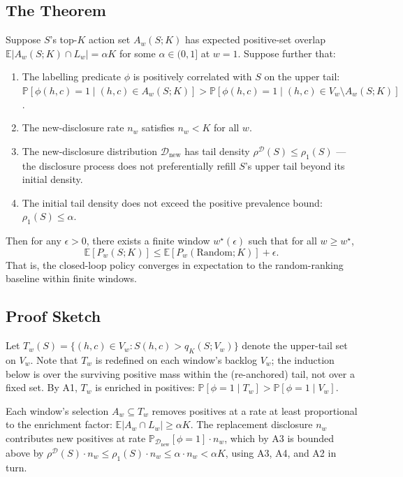 \subsection{The Theorem}

\begin{theorem}
\label{thm:exhaustion}
Suppose $S$'s top-$K$ action set $A_w(S; K)$ has expected positive-set
overlap $\mathbb{E}|A_w(S; K) \cap L_w| = \alpha K$ for some
$\alpha \in (0, 1]$ at $w = 1$. Suppose further that:
\begin{enumerate}
\item[(A1)] The labelling predicate $\phi$ is positively correlated
with $S$ on the upper tail: $\mathbb{P}[\phi(h, c) = 1 \mid (h, c) \in
A_w(S; K)] > \mathbb{P}[\phi(h, c) = 1 \mid (h, c) \in V_w \setminus A_w(S; K)]$.
\item[(A2)] The new-disclosure rate $n_w$ satisfies $n_w < K$ for all $w$.
\item[(A3)] The new-disclosure distribution $\mathcal{D}_{\text{new}}$
has tail density $\rho^{\mathcal{D}}(S) \leq \rho_1(S)$ ---
the disclosure process does not preferentially refill $S$'s upper
tail beyond its initial density.
\item[(A4)] The initial tail density does not exceed the positive
prevalence bound: $\rho_1(S) \leq \alpha$.
\end{enumerate}
Then for any $\epsilon > 0$, there exists a finite window
$w^\star(\epsilon)$ such that for all $w \geq w^\star$,
\begin{equation}
\mathbb{E}[P_w(S; K)] \leq \mathbb{E}[P_w(\mathrm{Random}; K)] + \epsilon.
\end{equation}
That is, the closed-loop policy converges in expectation to the random-ranking
baseline within finite windows.
\end{theorem}

\subsection{Proof Sketch}

Let $T_w(S) = \{(h, c) \in V_w : S(h, c) > q_K(S; V_w)\}$ denote the
upper-tail set on $V_w$. Note that $T_w$ is redefined on each
window's backlog $V_w$; the induction below is over the surviving
positive mass within the (re-anchored) tail, not over a fixed set.
By A1, $T_w$ is enriched in positives:
$\mathbb{P}[\phi = 1 \mid T_w] > \mathbb{P}[\phi = 1 \mid V_w]$.

Each window's selection $A_w \subseteq T_w$ removes positives at a
rate at least proportional to the enrichment factor:
$\mathbb{E}|A_w \cap L_w| \geq \alpha K$. The replacement disclosure
$n_w$ contributes new positives at rate
$\mathbb{P}_{\mathcal{D}_{\text{new}}}[\phi = 1] \cdot n_w$, which
by A3 is bounded above by $\rho^{\mathcal{D}}(S) \cdot n_w
\leq \rho_1(S) \cdot n_w \leq \alpha \cdot n_w < \alpha K$,
using A3, A4, and A2 in turn.

